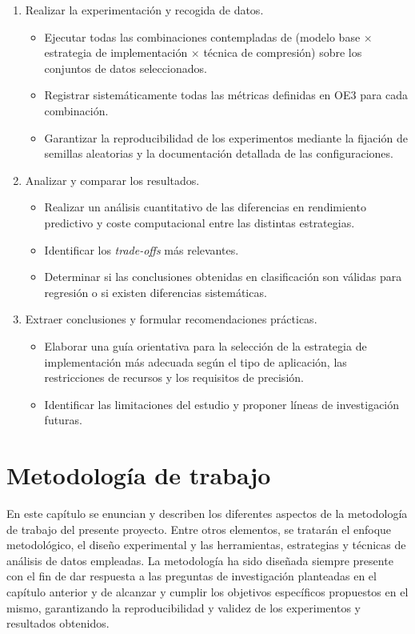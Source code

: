 \documentclass[a4paper,12pt,twoside,final]{book}
\begin{document}
\begin{enumerate}[label=\textbf{OE\arabic*}]
  \item Realizar la experimentación y recogida de datos.
  \begin{itemize}
    \item Ejecutar todas las combinaciones contempladas de (modelo base $\times$ estrategia de implementación
    $\times$ técnica de compresión) sobre los conjuntos de datos seleccionados.
    \item Registrar sistemáticamente todas las métricas definidas en OE3 para cada combinación.
    \item Garantizar la reproducibilidad de los experimentos mediante la fijación de semillas aleatorias y la
    documentación detallada de las configuraciones.
  \end{itemize}

  \item Analizar y comparar los resultados.
  \begin{itemize}
    \item Realizar un análisis cuantitativo de las diferencias en rendimiento predictivo y coste computacional entre
    las distintas estrategias.
    \item Identificar los \textit{trade-offs} más relevantes.
    \item Determinar si las conclusiones obtenidas en clasificación son válidas para regresión o si existen
    diferencias sistemáticas.
  \end{itemize}

  \item Extraer conclusiones y formular recomendaciones prácticas.
  \begin{itemize}
    \item Elaborar una guía orientativa para la selección de la estrategia de implementación más adecuada según el
    tipo de aplicación, las restricciones de recursos y los requisitos de precisión.
    \item Identificar las limitaciones del estudio y proponer líneas de investigación futuras.
  \end{itemize}
\end{enumerate}


\chapter{Metodología de trabajo}\label{chap:metodologia}
En este capítulo se enuncian y describen los diferentes aspectos de la metodología de trabajo del presente proyecto.
Entre otros elementos, se tratarán el enfoque metodológico, el diseño experimental y las herramientas, estrategias y
técnicas de análisis de datos empleadas. La metodología ha sido diseñada siempre presente con el fin de dar respuesta
a las preguntas de investigación planteadas en el capítulo anterior y de alcanzar y cumplir los objetivos específicos
propuestos en el mismo, garantizando la reproducibilidad y validez de los experimentos y resultados obtenidos.
\end{document}
